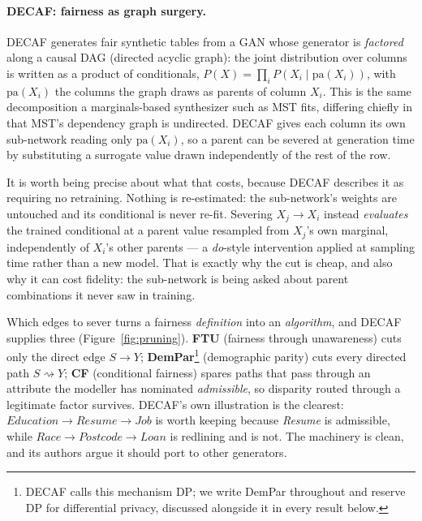 \documentclass{article}
\begin{document}
\paragraph{DECAF: fairness as graph surgery.}
DECAF \citep{vanbreugel2021decaf} generates fair synthetic tables from a GAN
whose generator is \emph{factored} along a causal DAG (directed acyclic
graph): the joint distribution over columns is written as a product of
conditionals, $P(X) = \prod_i P(X_i \mid \mathrm{pa}(X_i))$, with
$\mathrm{pa}(X_i)$ the columns the graph draws as parents of column $X_i$.
This is the same decomposition a marginals-based synthesizer such as MST
\citep{mckenna2021mst} fits, differing chiefly in that MST's dependency
graph is undirected. DECAF gives each column its own sub-network reading
only $\mathrm{pa}(X_i)$, so a parent can be severed at generation time by
substituting a surrogate value drawn independently of the rest of the row.

It is worth being precise about what that costs, because DECAF describes it
as requiring no retraining. Nothing is re-estimated: the sub-network's
weights are untouched and its conditional is never re-fit. Severing
$X_j \rightarrow X_i$ instead \emph{evaluates} the trained conditional at a
parent value resampled from $X_j$'s own marginal, independently of $X_i$'s
other parents --- a \emph{do}-style intervention applied at sampling time
rather than a new model. That is exactly why the cut is cheap, and also why
it can cost fidelity: the sub-network is being asked about parent
combinations it never saw in training.

Which edges to sever turns a fairness \emph{definition} into an
\emph{algorithm}, and DECAF supplies three (Figure~\ref{fig:pruning}).
\textbf{FTU} (fairness through unawareness) cuts only the direct edge $S
\rightarrow Y$; \textbf{DemPar}\footnote{DECAF calls this mechanism DP; we
write DemPar throughout and reserve DP for differential privacy, discussed
alongside it in every result below.} (demographic parity) cuts every directed
path $S \rightsquigarrow Y$; \textbf{CF} (conditional fairness) spares paths
that pass through an attribute the modeller has nominated \emph{admissible},
so disparity routed through a legitimate factor survives. DECAF's own
illustration is the clearest: $\textit{Education} \rightarrow \textit{Resume}
\rightarrow \textit{Job}$ is worth keeping because \textit{Resume} is
admissible, while $\textit{Race} \rightarrow \textit{Postcode} \rightarrow
\textit{Loan}$ is redlining and is not. The machinery is clean, and its
authors argue it should port to other generators.
\end{document}
